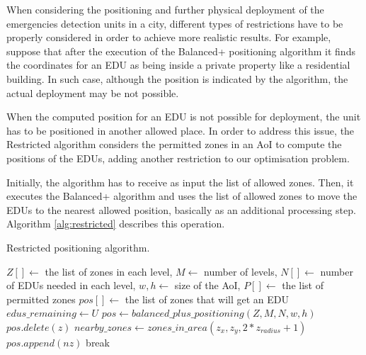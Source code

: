 \begin{refsection}
When considering the positioning and further physical deployment of the emergencies detection units in a city, different types of restrictions have to be properly considered in order to achieve more realistic results. For example, suppose that after the execution of the Balanced+ positioning algorithm it finds the coordinates for an EDU as being inside a private property like a residential building. In such case, although the position is indicated by the algorithm, the actual deployment may be not possible.

When the computed position for an EDU is not possible for deployment, the unit has to be positioned in another allowed place. In order to address this issue, the Restricted algorithm considers the permitted zones in an AoI to compute the positions of the EDUs, adding another restriction to our optimisation problem. 

Initially, the algorithm has to receive as input the list of allowed zones. Then, it executes the Balanced+ algorithm and uses the list of allowed zones to move the EDUs to the nearest allowed position, basically as an additional processing step. Algorithm \ref{alg:restricted} describes this operation. 

\begin{algorithm}[ht]
  \caption{Restricted positioning algorithm.}\label{alg:restricted}
  \begin{algorithmic}
    \REQUIRE $Z[] \gets$ the list of zones in each level, $M \gets$ number of levels, $N[] \gets$ number of EDUs needed in each level, $w, h \gets$ size of the AoI, $P[] \gets$ the list of permitted zones
    \ENSURE $pos[] \gets$ the list of zones that will get an EDU
    \STATE $edus\_remaining \gets U$
      \STATE $pos \gets balanced\_plus\_positioning(Z, M, N, w, h)$
          \STATE $pos.delete(z)$
          \STATE $nearby\_zones \gets zones\_in\_area(z_x, z_y, 2 * z_{radius} + 1)$
              \STATE $pos.append(nz)$
              \STATE break
            \ENDIF
          \ENDFOR
        \ENDIF
      \ENDFOR
    \ENDWHILE
  \end{algorithmic}
\end{algorithm}


\end{refsection}
